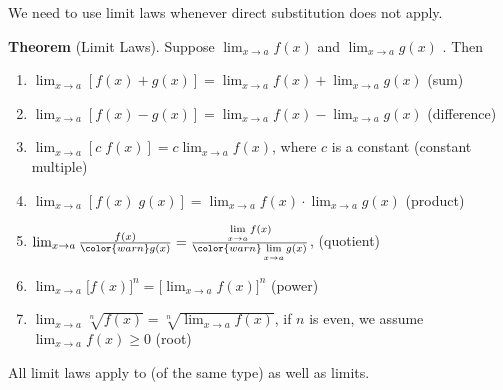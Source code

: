 \documentclass[../main.tex]{subfiles}
\begin{document}
We need to use limit laws whenever direct substitution does not apply.
\begin{mdframed}[style=withref-compact]
  \textbf{Theorem} (Limit Laws). Suppose \(\lim_{x \to a} f(x)\) and \(\lim_{x \to a} g(x)\) . Then
  \begin{enumerate}[label=(\arabic*)]
    \item \(\lim_{x \to a} [f(x) + g(x)] = \lim_{x \to a} f(x) + \lim_{x \to a} g(x)\) \hfill (sum)
    \item \(\lim_{x \to a} [f(x) - g(x)] = \lim_{x \to a} f(x) - \lim_{x \to a} g(x)\) \hfill (difference)
    \item \(\lim_{x \to a} [c \; f(x)] = c \lim_{x \to a} f(x)\), where \(c\) is a constant \hfill (constant multiple)
    \item \(\lim_{x \to a} [f(x) \; g(x)] = \lim_{x \to a} f(x) \cdot \lim_{x \to a} g(x)\) \hfill (product)
    \item \(\lim_{x \to a} \frac{f(x)}{{\color{warn} g(x)}} = \frac{\lim\limits_{x \to a} f(x)}{{\color{warn} \lim\limits_{x \to a} g(x)}}\), \quad {} \hfill (quotient)
    \item \(\lim_{x \to a} \bigg[f(x)\bigg]^{n} = \bigg[ \lim_{x \to a} f(x) \bigg]^{n}\) \hfill (power)
    \item \(\lim_{x \to a} \sqrt[n]{f(x)} = \sqrt[n]{\lim_{x \to a} f(x)}\), \quad if \(n\) is even, we assume {\(\lim_{x \to a} f(x) \ge 0\)} \hfill (root)
  \end{enumerate}

\end{mdframed}

\faStar{} All limit laws apply to  (of the same type) as well as  limits.


\end{document}
